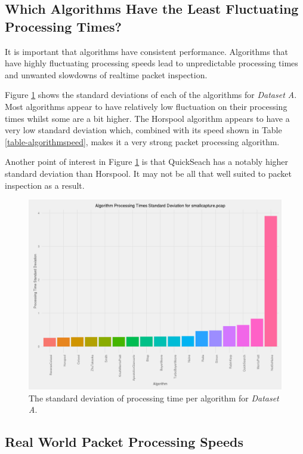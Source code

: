 \documentclass[11pt]{article}
\begin{document}
\subsection{Which Algorithms Have the Least Fluctuating Processing Times?}

It is important that algorithms have consistent performance. Algorithms that have highly fluctuating processing speeds lead to unpredictable processing times and unwanted slowdowns of realtime packet inspection.

Figure \ref{figure-standarddeviation} shows the standard deviations of each of the algorithms for \textit{Dataset A}. Most algorithms appear to have relatively low fluctuation on their processing times whilst some are a bit higher. The Horspool \citep{horspool1980} algorithm appears to have a very low standard deviation which, combined with its speed shown in Table \ref{table-algorithmspeed}, makes it a very strong packet processing algorithm.

Another point of interest in Figure \ref{figure-standarddeviation} is that QuickSeach has a notably higher standard deviation than Horspool. It may not be all that well suited to packet inspection as a result.

\begin{figure}[hbt]
  \includegraphics[width=\textwidth]{images/bar_graph_algorithm_standard_deviation_pcap}
  \caption{The standard deviation of processing time per algorithm for \textit{Dataset A}.}
  \label{figure-standarddeviation}
\end{figure}


\subsection{Real World Packet Processing Speeds}
\end{document}
